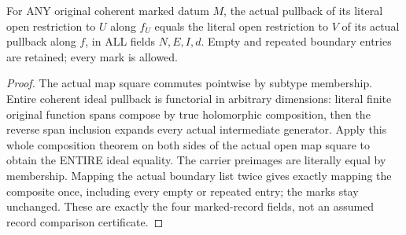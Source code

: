 \begin{theorem}
\label{hir:submersion-contact-restriction-marked-open-square}
\leanok
For ANY original coherent marked datum $M$, the actual pullback of its
literal open restriction to $U$ along $f_U$ equals the literal open
restriction to $V$ of its actual pullback along $f$, in ALL fields $N,E,I,d$.
Empty and repeated boundary entries are retained; every mark is allowed.
\end{theorem}
\begin{proof}
The actual map square commutes pointwise by subtype membership. Entire
coherent ideal pullback is functorial in arbitrary dimensions: literal
finite original function spans compose by true holomorphic composition,
then the reverse span inclusion expands every actual intermediate generator.
Apply this whole composition theorem on both sides of the actual open map
square to obtain the ENTIRE ideal equality. The carrier preimages are
literally equal by membership. Mapping the actual boundary list twice gives
exactly mapping the composite once, including every empty or repeated entry;
the marks stay unchanged. These are exactly the four marked-record fields,
not an assumed record comparison certificate.
\end{proof}

